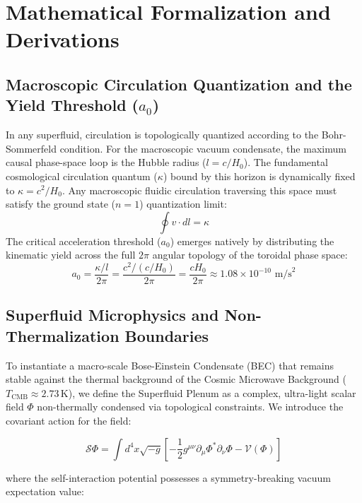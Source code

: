 \documentclass[aps,prd,10pt,onecolumn,superscriptaddress,nofootinbib]{revtex4-2}
\begin{document}
\section{\label{sec:math}Mathematical Formalization and Derivations}

\subsection{Macroscopic Circulation Quantization and the Yield Threshold (\texorpdfstring{$a_0$}{a0})}
In any superfluid, circulation is topologically quantized according to the Bohr-Sommerfeld condition. For the macroscopic vacuum condensate, the maximum causal phase-space loop is the Hubble radius ($l = c/H_0$). The fundamental cosmological circulation quantum ($\kappa$) bound by this horizon is dynamically fixed to $\kappa = c^2/H_0$. Any macroscopic fluidic circulation traversing this space must satisfy the ground state ($n=1$) quantization limit:
\begin{equation}
\oint v \cdot dl = \kappa
\end{equation}
The critical acceleration threshold ($a_0$) emerges natively by distributing the kinematic yield across the full $2\pi$ angular topology of the toroidal phase space:
\begin{equation}
a_0 = \frac{\kappa / l}{2\pi} = \frac{c^2 / (c/H_0)}{2\pi} = \frac{c H_0}{2\pi} \approx 1.08 \times 10^{-10} \text{ m/s}^2
\end{equation}

\subsection{\label{sec:microphysics}Superfluid Microphysics and Non-Thermalization Boundaries}

To instantiate a macro-scale Bose-Einstein Condensate (BEC) that remains stable against the thermal background of the Cosmic Microwave Background ($T_{\text{CMB}} \approx 2.73\,\text{K}$), we define the Superfluid Plenum as a complex, ultra-light scalar field $\Phi$ non-thermally condensed via topological constraints. We introduce the covariant action for the field:

\begin{equation}
\mathcal{S}\Phi = \int d^4x \sqrt{-g} \left[ -\frac{1}{2} g^{\mu\nu} \partial_\mu \Phi^* \partial_\nu \Phi - \mathcal{V}(\Phi) \right]
\end{equation}

where the self-interaction potential possesses a symmetry-breaking vacuum expectation value:
\end{document}
